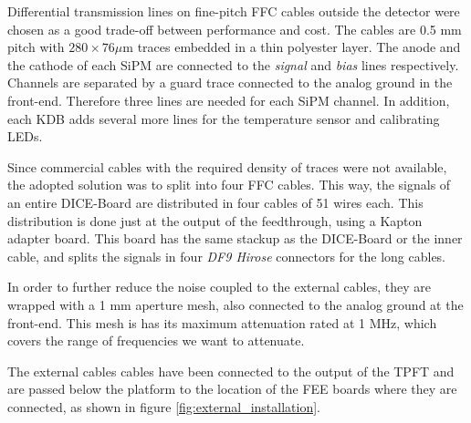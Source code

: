 Differential transmission lines on fine-pitch FFC cables outside the detector were chosen as a good trade-off between performance and cost. The cables are 0.5 mm pitch with $280 \times 76 \mu$m traces embedded in a thin polyester layer. The anode and the cathode of each SiPM are connected to the \textit{signal} and \textit{bias} lines respectively. Channels are separated by a guard trace connected to the analog ground in the front-end. Therefore three lines are needed for each SiPM channel. In addition, each KDB adds several more lines for the temperature sensor and  calibrating LEDs.


Since commercial cables with the required density of traces were not available, the adopted solution was to split into four FFC cables. This way, the signals of an entire DICE-Board are distributed in four cables of 51 wires each. This distribution is done just at the output of the feedthrough, using a Kapton adapter board. This board has the same stackup as the DICE-Board or the inner cable, and splits the signals in four \textit{DF9 Hirose} connectors for the long cables.

In order to further reduce the noise coupled to the external cables, they are wrapped with a 1 mm aperture mesh, also connected to the analog ground at the front-end. This mesh is has its maximum attenuation rated at 1 MHz, which covers the range of frequencies we want to attenuate.

The external cables cables have been connected to the output of the TPFT and are passed below the platform to the location of the FEE boards where they are connected, as shown in figure \ref{fig:external_installation}.

